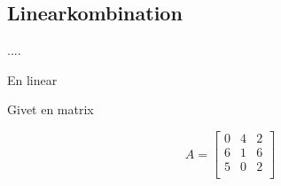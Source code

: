 \subsection{Linearkombination}

....

\begin{defn}{}{}
En linear 

\end{defn}



Givet en matrix 

$$A=
\begin{bmatrix}
0 & 4 & 2 \\
6 & 1 & 6 \\
5 & 0 & 2 \\
\end{bmatrix}
$$